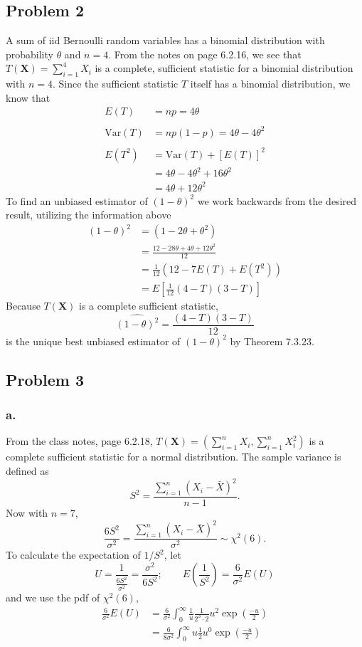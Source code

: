 \documentclass{article}
\begin{document}
\subsection*{Problem 2}
A sum of iid Bernoulli random variables has a binomial distribution with probability $\theta$ and $n=4$. From the notes on page 6.2.16, we see that $T(\mathbf{X}) = \sum_{i=1}^4 X_i$ is a complete, sufficient statistic for a binomial distribution with $n=4$. Since the sufficient statistic $T$ itself has a binomial distribution, we know that 
\begin{align*}
E(T) &= np = 4\theta \\ \\
\mathrm{Var}(T) &= np(1-p) = 4\theta - 4 \theta^2 \\ \\
E(T^2) &= \mathrm{Var}(T) + \left[E(T)\right]^2\\
&=4\theta-4\theta^2 + 16\theta^2 \\
&=4\theta + 12\theta^2
\end{align*}
To find an unbiased estimator of $(1-\theta)^2$ we work backwards from the desired result, utilizing the information above
\begin{align*}
(1-\theta)^2 &= (1-2\theta+\theta^2) \\
&=\frac{12-28\theta+4\theta+12\theta^2}{12} \\
&=\frac{1}{12}\left(12-7E(T)+E(T^2)\right) \\
&=E\left[\frac{1}{12}(4-T)(3-T)\right]
\end{align*}
Because $T(\mathbf{X})$ is a complete sufficient statistic, 
\[\widehat{(1-\theta)^2} = \frac{(4-T)(3-T)}{12}\] is the unique best unbiased estimator of $(1-\theta)^2$ by Theorem 7.3.23.

\subsection*{Problem 3}
\subsubsection*{a.}
From the class notes, page 6.2.18, $T(\mathbf{X}) = (\sum_{i=1}^nX_i, \sum_{i=1}^nX_i^2)$ is a complete sufficient statistic for a normal distribution. The sample variance is defined as \[S^2=\frac{\sum_{i=1}^n\left(X_i-\bar{X}\right)^2}{n-1}.\] Now with $n=7$, \[\frac{6S^2}{\sigma^2} = \frac{\sum_{i=1}^n\left(X_i-\bar{X}\right)^2}{\sigma^2} \sim \chi^2(6).\] To calculate the expectation of $1/S^2$, let 
\[U = \frac{1}{\frac{6S^2}{\sigma^2}} = \frac{\sigma^2}{6S^2}; \qquad E\left(\frac{1}{S^2}\right) = \frac{6}{\sigma^2}E(U)\] and we use the pdf of $\chi^2(6)$,
\begin{align*}
\frac{6}{\sigma^2}E(U)&=\frac{6}{\sigma^2}\int_0^\infty\frac{1}{u}\frac{1}{2^3\cdot2}u^2\exp\left(\frac{-u}{2}\right) \\
&=\frac{6}{8\sigma^2}\int_0^\infty u\frac{1}{2}u^0\exp\left(\frac{-u}{2}\right)
\end{align*}
\end{document}
